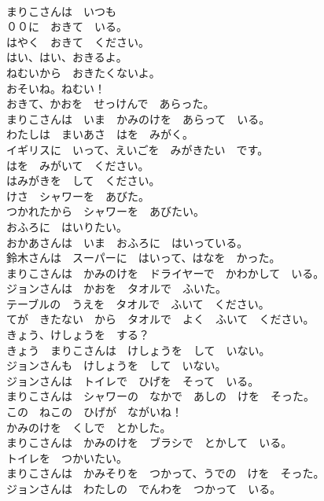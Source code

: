 \documentclass[8pt]{extreport}
\begin{document}
\begin{CJK}{UTF8}{min}
\\	まりこさんは　いつも　
\\	００に　おきて　いる。	
\\	はやく　おきて　ください。	
\\	はい、はい、おきるよ。	
\\	ねむいから　おきたくないよ。	
\\	おそいね。ねむい！	
\\	おきて、かおを　せっけんで　あらった。	
\\	まりこさんは　いま　かみのけを　あらって　いる。	
\\	わたしは　まいあさ　はを　みがく。	
\\	イギリスに　いって、えいごを　みがきたい　です。	
\\	はを　みがいて　ください。	
\\	はみがきを　して　ください。	
\\	けさ　シャワーを　あびた。	
\\	つかれたから　シャワーを　あびたい。	
\\	おふろに　はいりたい。	
\\	おかあさんは　いま　おふろに　はいっている。	
\\	鈴木さんは　スーパーに　はいって、はなを　かった。	
\\	まりこさんは　かみのけを　ドライヤーで　かわかして　いる。	
\\	ジョンさんは　かおを　タオルで　ふいた。	
\\	テーブルの　うえを　タオルで　ふいて　ください。	
\\	てが　きたない　から　タオルで　よく　ふいて　ください。	
\\	きょう、けしょうを　する？	
\\	きょう　まりこさんは　けしょうを　して　いない。	
\\	ジョンさんも　けしょうを　して　いない。	
\\	ジョンさんは　トイレで　ひげを　そって　いる。	
\\	まりこさんは　シャワーの　なかで　あしの　けを　そった。	
\\	この　ねこの　ひげが　ながいね！	
\\	かみのけを　くしで　とかした。	
\\	まりこさんは　かみのけを　ブラシで　とかして　いる。	
\\	トイレを　つかいたい。	
\\	まりこさんは　かみそりを　つかって、うでの　けを　そった。	
\\	ジョンさんは　わたしの　でんわを　つかって　いる。	

\end{CJK}
\end{document}
